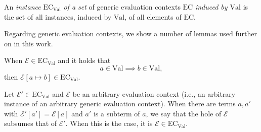 \begin{definition}
An \textit{instance} $\textrm{EC}_{\textrm{Val}}$ \textit{of a set} of generic evaluation contexts $\textrm{EC}$ \textit{induced by $\textrm{Val}$} is the set of all instances, induced by $\textrm{Val}$, of all elements of $\textrm{EC}$.
\end{definition}

Regarding generic evaluation contexts, we show a number of lemmas used further on in this work.

\begin{lemma}
When $\mathcal{E} \in \textrm{EC}_{\textrm{Val}}$ and it holds that
\[
a \in \textrm{Val} \implies b \in \textrm{Val},
\]
then $\mathcal{E}[a \mapsto b] \in \textrm{EC}_{\textrm{Val}}$.
\end{lemma}

\begin{lemma}
Let $\mathcal{E}' \in \textrm{EC}_{\textrm{Val}}$ and $\mathcal{E}$ be an arbitrary evaluation context (i.e., an arbitrary instance of an arbitrary generic evaluation context). When there are terms $a, a'$ with $\mathcal{E}'[a'] = \mathcal{E}[a]$ and $a'$ is a subterm of $a$, we say that the hole of $\mathcal{E}$ subsumes that of $\mathcal{E}'$. When this is the case, it is $\mathcal{E} \in \textrm{EC}_{\textrm{Val}}$.
\end{lemma}
